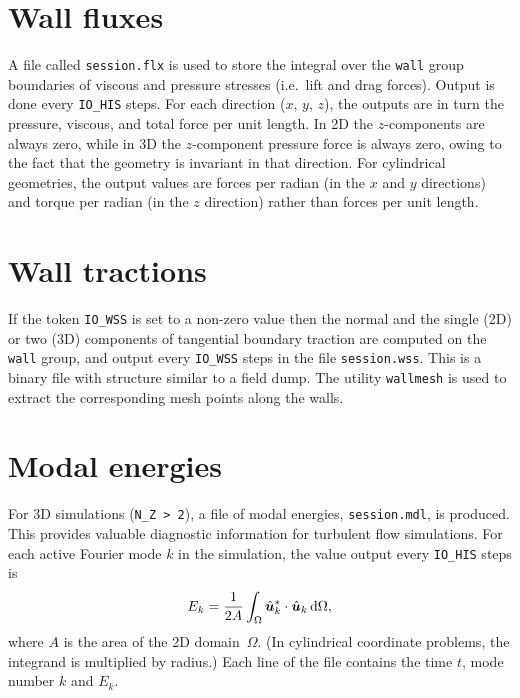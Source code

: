 \documentclass[11pt,a4paper]{report}
\begin{document}
\section{Wall fluxes}
\label{sec.flux}

A file called \verb+session.flx+ is used to store the integral over
the \verb+wall+ group boundaries of viscous and pressure stresses
(i.e.\ lift and drag forces).  Output is done every \verb+IO_HIS+
steps.  For each direction ($x$, $y$, $z$), the outputs are in turn
the pressure, viscous, and total force per unit length.  In 2D the
$z$-components are always zero, while in 3D the $z$-component pressure
force is always zero, owing to the fact that the geometry is invariant
in that direction.  For cylindrical geometries, the output values are
forces per radian (in the $x$ and $y$ directions) and torque per
radian (in the $z$ direction) rather than forces per unit length.

\section{Wall tractions}
\label{sec.traction}

If the token \verb+IO_WSS+ is set to a non-zero value then the normal
and the single (2D) or two (3D) components of tangential boundary
traction are computed on the \verb+wall+ group, and output every
\verb+IO_WSS+ steps in the file \verb+session.wss+.  This is a binary
file with structure similar to a field dump.  The utility
\verb+wallmesh+ is used to extract the corresponding mesh points
along the walls.

\section{Modal energies}
\label{sec.modal}

For 3D simulations (\verb+N_Z > 2+), a file of modal energies,
\verb+session.mdl+, is produced.  This provides valuable diagnostic
information for turbulent flow simulations.  For each active Fourier
mode $k$ in the simulation, the value output every \verb+IO_HIS+ steps
is 
\[
E_k =
\frac{1}{2A}\int_\Omega
\hat{\bm{u}}_k^\ast\cdot\hat{\bm{u}}_k \,{\rm d}\Omega,
\]
where $A$ is the area of the 2D domain~$\Omega$.  (In cylindrical
coordinate problems, the integrand is multiplied by radius.) Each line
of the file contains the time $t$, mode number $k$ and $E_k$.
\end{document}
